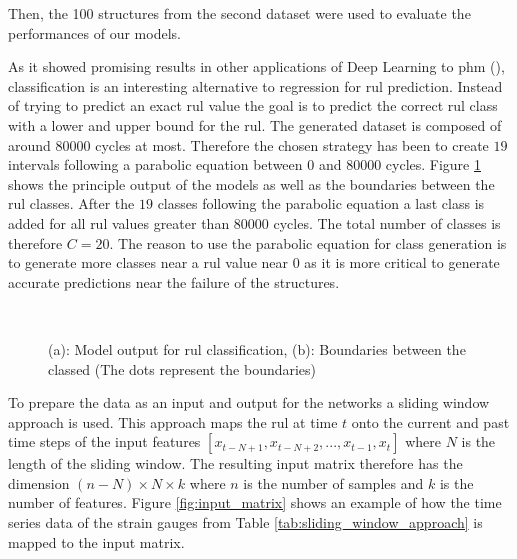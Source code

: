 \documentclass[conference]{IEEEtran}
\begin{document}
Then, the 100 structures from the second dataset were used to evaluate the performances of our models.


As it showed promising results in other applications of Deep Learning to \gls{phm} (\cite{Liu2019a, Xiao2016}), classification is an interesting alternative to regression for \gls{rul} prediction. Instead of trying to predict an exact \gls{rul} value the goal is to predict the correct \gls{rul} class with a lower and upper bound for the \gls{rul}. The generated dataset is composed of around $ 80 000 $ cycles at most. Therefore the chosen strategy has been to create $ 19 $ intervals following a parabolic equation between $ 0 $ and $ 80 000 $ cycles. Figure \ref{fig:RNN_classification} shows the principle output of the models as well as the boundaries between the \gls{rul} classes. After the $ 19 $ classes following the parabolic equation a last class is added for all \gls{rul} values greater than $ 80 000 $ cycles. The total number of classes is therefore $ C = 20 $. The reason to use the parabolic equation for class generation is to generate more classes near a \gls{rul} value near $ 0 $ as it is more critical to generate accurate predictions near the failure of the structures.

\begin{figure}[htp]
	\centering
	\\
	\caption{(a): Model output for \gls{rul} classification, (b): Boundaries between the classed (The dots represent the boundaries)}
	\label{fig:RNN_classification}
\end{figure}

To prepare the data as an input and output for the networks a sliding window approach is used. This approach maps the \gls{rul} at time $ t $ onto the current and past time steps of the input features $ [x_{t-N+1}, x_{t-N+2},..., x_{t-1}, x_t] $ where $ N $ is the length of the sliding window. The resulting input matrix therefore has the dimension $ (n-N) \times N \times k $ where $ n $ is the number of samples and $ k $ is the number of features. Figure \ref{fig:input_matrix} shows an example of how the time series data of the strain gauges from Table \ref{tab:sliding_window_approach} is mapped to the input matrix.
\end{document}
